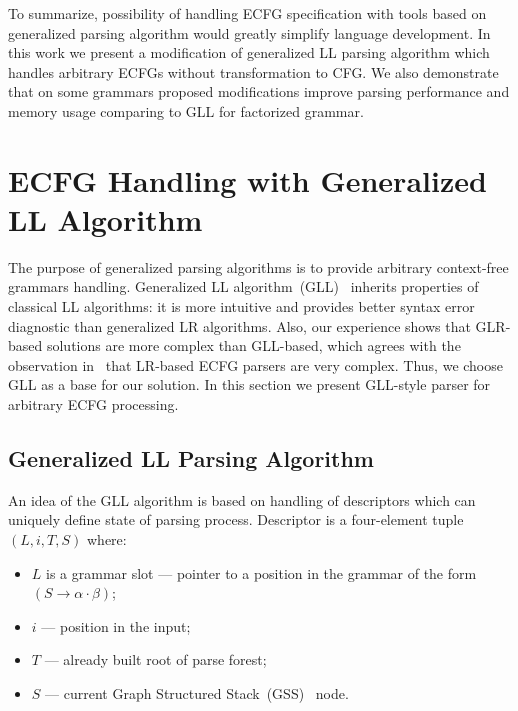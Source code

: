 \documentclass[runningheads,a4paper]{llncs}
\begin{document}
To summarize, possibility of handling ECFG specification with tools based on generalized parsing algorithm would greatly simplify language development.
In this work we present a modification of generalized LL parsing algorithm which handles arbitrary ECFGs without transformation to CFG.
We also demonstrate that on some grammars proposed modifications improve parsing performance and memory usage comparing to GLL for factorized grammar.

\section{ECFG Handling with Generalized LL Algorithm}%

The purpose of generalized parsing algorithms is to provide arbitrary context-free grammars handling.
Generalized LL algorithm~(GLL)~\cite{scott2010gll} inherits properties of classical LL algorithms: it is more intuitive and provides better syntax error diagnostic than generalized LR algorithms.
Also, our experience shows that GLR-based solutions are more complex than GLL-based, which agrees with the observation in~\cite{ECFG} that LR-based ECFG parsers are very complex. 
Thus, we choose GLL as a base for our solution.
In this section we present GLL-style parser for arbitrary ECFG processing.

\subsection{Generalized LL Parsing Algorithm}%

An idea of the GLL algorithm is based on handling of descriptors which can uniquely define state of parsing process.
Descriptor is a four-element tuple $(L, i, T, S)$ where: 
\begin{itemize}
\item $L$ is a grammar slot --- pointer to a position in the grammar of the form~$(S \to \alpha \cdot \beta)$;
\item $i$ --- position in the input;
\item $T$ --- already built root of parse forest;
\item $S$ --- current Graph Structured Stack~(GSS)~\cite{afroozeh2015faster} node.
\end{itemize}
\end{document}
